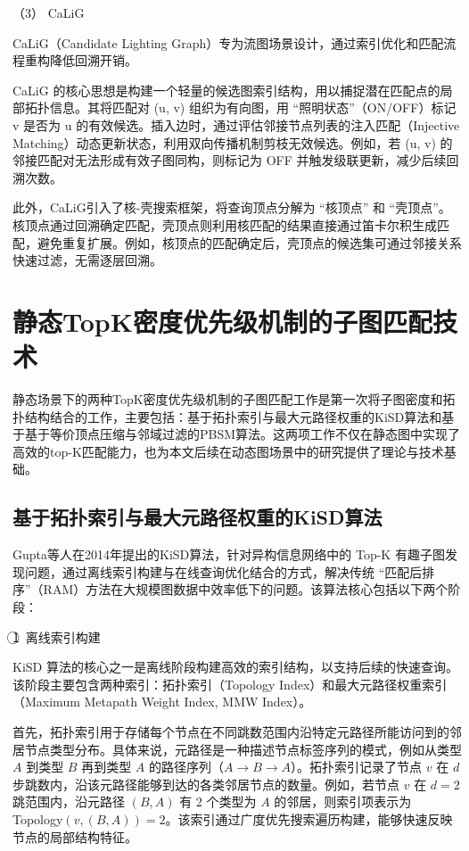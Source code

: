 （3） CaLiG

CaLiG（Candidate Lighting Graph）专为流图场景设计，通过索引优化和匹配流程重构降低回溯开销。

CaLiG 的核心思想是构建一个轻量的候选图索引结构，用以捕捉潜在匹配点的局部拓扑信息。其将匹配对 (u, v) 组织为有向图，用 “照明状态”（ON/OFF）标记 v 是否为 u 的有效候选。插入边时，通过评估邻接节点列表的注入匹配（Injective Matching）动态更新状态，利用双向传播机制剪枝无效候选。例如，若 (u, v) 的邻接匹配对无法形成有效子图同构，则标记为 OFF 并触发级联更新，减少后续回溯次数。

此外，CaLiG引入了核-壳搜索框架，将查询顶点分解为 “核顶点” 和 “壳顶点”。核顶点通过回溯确定匹配，壳顶点则利用核匹配的结果直接通过笛卡尔积生成匹配，避免重复扩展。例如，核顶点的匹配确定后，壳顶点的候选集可通过邻接关系快速过滤，无需逐层回溯。

\section{静态TopK密度优先级机制的子图匹配技术}
静态场景下的两种TopK密度优先级机制的子图匹配工作是第一次将子图密度和拓扑结构结合的工作，主要包括：基于拓扑索引与最大元路径权重的KiSD算法和基于基于等价顶点压缩与邻域过滤的PBSM算法。这两项工作不仅在静态图中实现了高效的top-K匹配能力，也为本文后续在动态图场景中的研究提供了理论与技术基础。
\subsection{基于拓扑索引与最大元路径权重的KiSD算法}
Gupta\cite{static-topk-Gupta-DBLP:conf/icde/GuptaGYCH14}等人在2014年提出的KiSD算法，针对异构信息网络中的 Top-K 有趣子图发现问题，通过离线索引构建与在线查询优化结合的方式，解决传统 “匹配后排序”（RAM）方法在大规模图数据中效率低下的问题。该算法核心包括以下两个阶段：

\textcircled{1}~离线索引构建

KiSD 算法的核心之一是离线阶段构建高效的索引结构，以支持后续的快速查询。该阶段主要包含两种索引：拓扑索引（Topology Index）和最大元路径权重索引（Maximum Metapath Weight Index, MMW Index）。

首先，拓扑索引用于存储每个节点在不同跳数范围内沿特定元路径所能访问到的邻居节点类型分布。具体来说，元路径是一种描述节点标签序列的模式，例如从类型 $A$ 到类型 $B$ 再到类型 $A$ 的路径序列（$A \rightarrow B \rightarrow A$）。拓扑索引记录了节点 $v$ 在 $d$ 步跳数内，沿该元路径能够到达的各类邻居节点的数量。例如，若节点 $v$ 在 $d=2$ 跳范围内，沿元路径 $(B,A)$ 有 2 个类型为 $A$ 的邻居，则索引项表示为 Topology$(v, (B,A))=2$。该索引通过广度优先搜索遍历构建，能够快速反映节点的局部结构特征。

